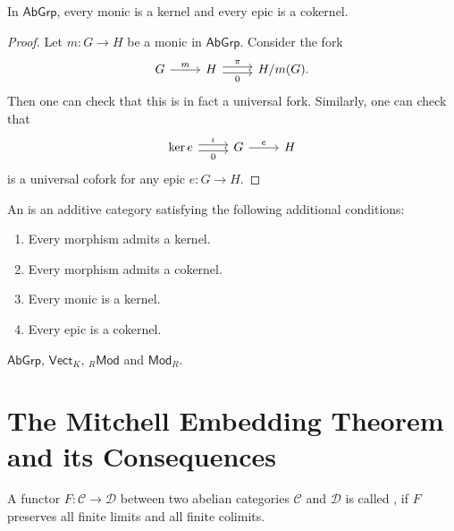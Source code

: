 \begin{lemma}
	In $\mathsf{AbGrp}$, every monic is a kernel and every epic is a cokernel.
\end{lemma}

\begin{proof}
	Let $m : G \to H$ be a monic in $\mathsf{AbGrp}$. Consider the fork
	\begin{equation*}
		\begin{tikzcd}
			G \arrow[r,"m"] & H \arrow[r,shift left,"\pi"]\arrow[r,shift right,"0"'] & H/m(G).
		\end{tikzcd}
	\end{equation*}
	\noindent Then one can check that this is in fact a universal fork. Similarly, one can check that
	\begin{equation*}
		\begin{tikzcd}
			\ker e \arrow[r,shift left,"\iota"]\arrow[r,shift right,"0"'] & G \arrow[r,"e"] & H
		\end{tikzcd}
	\end{equation*}
	\noindent is a universal cofork for any epic $e : G \to H$.
\end{proof}

\begin{definition}
	An  is an additive category satisfying the following additional conditions:
	\begin{enumerate}[label = \textup{(}\alph*\textup{)}, wide = 0pt]
		\item Every morphism admits a kernel.
		\item Every morphism admits a cokernel.
		\item Every monic is a kernel.
		\item Every epic is a cokernel.
	\end{enumerate}
\end{definition}

\begin{examples}
	$\mathsf{AbGrp}$, $\mathsf{Vect}_K$, $_{R}\mathsf{Mod}$ and $\mathsf{Mod}_R$.	
\end{examples}

\section{The Mitchell Embedding Theorem and its Consequences}

\begin{definition}
	A functor $F : \mathcal{C} \to \mathcal{D}$ between two abelian categories $\mathcal{C}$ and $\mathcal{D}$ is called , if $F$ preserves all finite limits and all finite colimits.
\end{definition}


